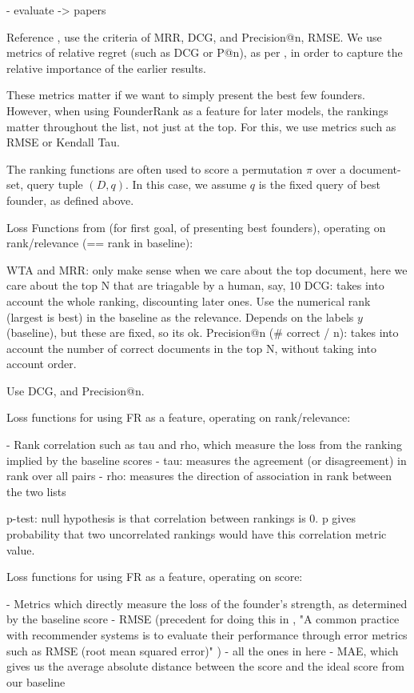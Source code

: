 - evaluate -> papers

Reference \cite{DBLP:journals/corr/abs-0704-3359}, use the criteria of MRR, DCG, and Precision@n, RMSE. We use metrics of relative regret (such as DCG or P@n), as per \cite{DBLP:journals/corr/abs-0704-3359}, in order to capture the relative importance of the earlier results.

These metrics matter if we want to simply present the best few founders. However, when using FounderRank as a feature for later models, the rankings matter throughout the list, not just at the top. For this, we use metrics such as RMSE or Kendall Tau.

The ranking functions are often used to score a permutation $\pi$ over a document-set, query tuple $(D, q)$. In this case, we assume $q$ is the fixed query of best founder, as defined above.

Loss Functions from \cite{DBLP:journals/corr/abs-0704-3359} (for first goal, of presenting best founders), operating on rank/relevance (== rank in baseline):

WTA and MRR: only make sense when we care about the top document, here we care about the top N that are triagable by a human, say, 10
DCG: takes into account the whole ranking, discounting later ones. Use the numerical rank (largest is best) in the baseline as the relevance. Depends on the labels $y$ (baseline), but these are fixed, so its ok.
Precision@n (\# correct / n): takes into account the number of correct documents in the top N, without taking into account order.

Use DCG, and Precision@n.

Loss functions for using FR as a feature, operating on rank/relevance:

- Rank correlation such as tau and rho, which measure the loss from the ranking implied by the baseline scores
  - tau: measures the agreement (or disagreement) in rank over all pairs
  - rho: measures the direction of association in rank between the two lists

p-test: null hypothesis is that correlation between rankings is 0. p gives probability that two uncorrelated rankings would have this correlation metric value.

Loss functions for using FR as a feature, operating on score:

- Metrics which directly measure the loss of the founder's strength, as determined by the baseline score
  - RMSE (precedent for doing this in \cite{said2014comparative}, "A common practice with recommender systems is to evaluate their performance through error metrics such as RMSE (root mean squared error)" \cite{Cremonesi:2010:PRA:1864708.1864721})
  - all the ones in here \cite{Gunawardana:2009:SAE:1577069.1755883}
  - MAE, which gives us the average absolute distance between the score and the ideal score from our baseline

